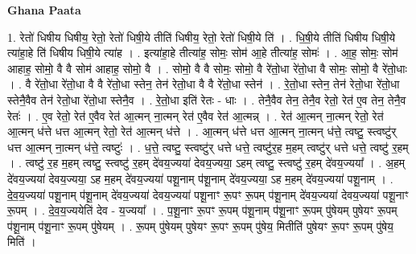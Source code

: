 \documentclass[17pt]{extarticle}
\begin{document}
\textbf{Ghana Paata } \newline

1. रेतो॑ धिषीय धिषीय॒ रेतो॒ रेतो॑ धिषी॒ये तीति॑ धिषीय॒ रेतो॒ रेतो॑ धिषी॒ये ति॑ । . धि॒षी॒ये तीति॑ धिषीय धिषी॒ये त्या॑हा॒हे ति॑ धिषीय धिषी॒ये त्या॑ह । . इत्या॑हा॒हे तीत्या॑ह॒ सोमः॒ सोम॑ आ॒हे तीत्या॑ह॒ सोमः॑ । . आ॒ह॒ सोमः॒ सोम॑ आहाह॒ सोमो॒ वै वै सोम॑ आहाह॒ सोमो॒ वै । . सोमो॒ वै वै सोमः॒ सोमो॒ वै रे॑तो॒धा रे॑तो॒धा वै सोमः॒ सोमो॒ वै रे॑तो॒धाः । . वै रे॑तो॒धा रे॑तो॒धा वै वै रे॑तो॒धा स्तेन॒ तेन॑ रेतो॒धा वै वै रे॑तो॒धा स्तेन॑ । . रे॒तो॒धा स्तेन॒ तेन॑ रेतो॒धा रे॑तो॒धा स्तेनै॒वैव तेन॑ रेतो॒धा रे॑तो॒धा स्तेनै॒व । . रे॒तो॒धा इति॑ रेतः - धाः । . तेनै॒वैव तेन॒ तेनै॒व रेतो॒ रेत॑ ए॒व तेन॒ तेनै॒व रेतः॑ । . ए॒व रेतो॒ रेत॑ ए॒वैव रेत॑ आ॒त्मन् ना॒त्मन् रेत॑ ए॒वैव रेत॑ आ॒त्मन्न् । . रेत॑ आ॒त्मन् ना॒त्मन् रेतो॒ रेत॑ आ॒त्मन् ध॑त्ते धत्त आ॒त्मन् रेतो॒ रेत॑ आ॒त्मन् ध॑त्ते । . आ॒त्मन् ध॑त्ते धत्त आ॒त्मन् ना॒त्मन् ध॑त्ते॒ त्वष्टु॒ स्त्वष्टु॑र् धत्त आ॒त्मन् ना॒त्मन् ध॑त्ते॒ त्वष्टुः॑ । . ध॒त्ते॒ त्वष्टु॒ स्त्वष्टु॑र् धत्ते धत्ते॒ त्वष्टु॑र॒ह म॒हम् त्वष्टु॑र् धत्ते धत्ते॒ त्वष्टु॑ र॒हम् । . त्वष्टु॑ र॒ह म॒हम् त्वष्टु॒ स्त्वष्टु॑ र॒हम् दे॑वय॒ज्यया॑ देवय॒ज्यया॒ ऽहम् त्वष्टु॒ स्त्वष्टु॑ र॒हम् दे॑वय॒ज्यया᳚ । . अ॒हम् दे॑वय॒ज्यया॑ देवय॒ज्यया॒ ऽह म॒हम् दे॑वय॒ज्यया॑ पशू॒नाम् प॑शू॒नाम् दे॑वय॒ज्यया॒ ऽह म॒हम् दे॑वय॒ज्यया॑ पशू॒नाम् । . दे॒व॒य॒ज्यया॑ पशू॒नाम् प॑शू॒नाम् दे॑वय॒ज्यया॑ देवय॒ज्यया॑ पशू॒नाꣳ रू॒पꣳ रू॒पम् प॑शू॒नाम् दे॑वय॒ज्यया॑ देवय॒ज्यया॑ पशू॒नाꣳ रू॒पम् । . दे॒व॒य॒ज्ययेति॑ देव - य॒ज्यया᳚ । . प॒शू॒नाꣳ रू॒पꣳ रू॒पम् प॑शू॒नाम् प॑शू॒नाꣳ रू॒पम् पु॑षेयम् पुषेयꣳ रू॒पम् प॑शू॒नाम् प॑शू॒नाꣳ रू॒पम् पु॑षेयम् । . रू॒पम् पु॑षेयम् पुषेयꣳ रू॒पꣳ रू॒पम् पु॑षेय॒ मितीति॑ पुषेयꣳ रू॒पꣳ रू॒पम् पु॑षेय॒ मिति॑ । \newline
\end{document}

